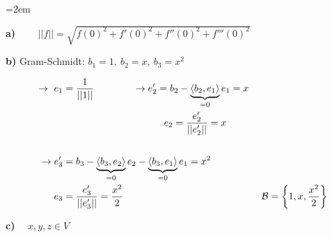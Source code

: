 \begin{solution}    

    \vspace{1\baselineskip}

    \leftskip=2em

    \textbf{a)} \( \qquad ||f|| = \sqrt{f(0)^2 + f'(0)^2 + f''(0)^2 + f'''(0)^2} \)

    \vspace{1.5\baselineskip}

    \textbf{b)} Gram-Schmidt: \( b_1 = 1, \ b_2 = x, \ b_3 = x^2 \)

    \begin{equation*}
        \begin{aligned}
            \rightarrow \ e_1 &= \frac{1}{||1||} \qquad \qquad \rightarrow e_2' = b_2 - \underbrace{\langle b_2,e_1 \rangle}_{=0} e_1 = x \\
            & \hspace{3.65cm} e_2 = \frac{e_2'}{||e_2'||} = x \\[1.75em]
            \rightarrow e_3' &= b_3 - \underbrace{\langle b_3,e_2 \rangle}_{=0} e_2 - \underbrace{\langle b_3,e_1 \rangle}_{=0} e_1 = x^2 \\
            \qquad e_3 &= \frac{e_3'}{||e_3'||} = \frac{x^2}{2} \hspace{5cm} \mathcal{B} = \left\{ 1, x, \frac{x^2}{2} \right\}
        \end{aligned}
    \end{equation*}

    \vspace{1\baselineskip}

    \textbf{c)} \( \quad x, y, z \in V \)
    

\end{solution}
